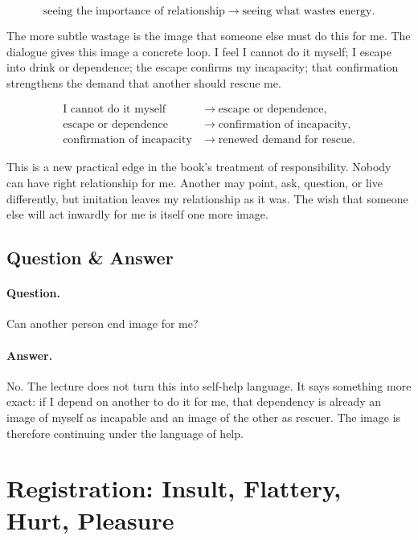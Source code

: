 \documentclass[11pt,oneside]{book}
\begin{document}
\begin{equation}
\text{seeing the importance of relationship}
\longrightarrow
\text{seeing what wastes energy}.
\end{equation}

The more subtle wastage is the image that someone else must do this for me. The dialogue gives this image a concrete loop. I feel I cannot do it myself; I escape into drink or dependence; the escape confirms my incapacity; that confirmation strengthens the demand that another should rescue me.

\begin{align}
\text{I cannot do it myself}
&\longrightarrow \text{escape or dependence},\\
\text{escape or dependence}
&\longrightarrow \text{confirmation of incapacity},\\
\text{confirmation of incapacity}
&\longrightarrow \text{renewed demand for rescue}.
\end{align}

This is a new practical edge in the book's treatment of responsibility. Nobody can have right relationship for me. Another may point, ask, question, or live differently, but imitation leaves my relationship as it was. The wish that someone else will act inwardly for me is itself one more image.

\subsection{Question \& Answer}

\paragraph{Question.}
Can another person end image for me?

\paragraph{Answer.}
No. The lecture does not turn this into self-help language. It says something more exact: if I depend on another to do it for me, that dependency is already an image of myself as incapable and an image of the other as rescuer. The image is therefore continuing under the language of help.

\section{Registration: Insult, Flattery, Hurt, Pleasure}
\end{document}
